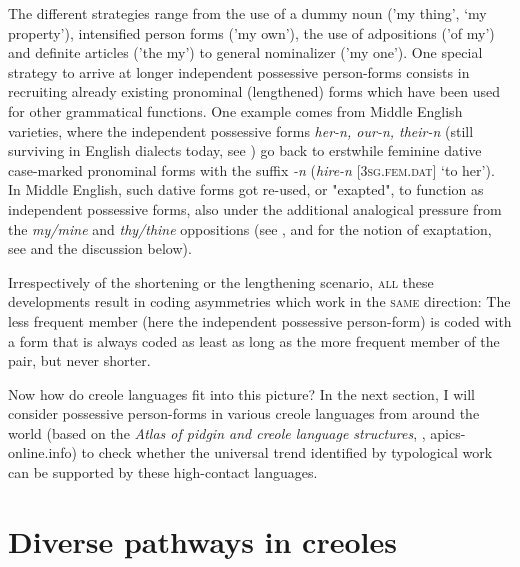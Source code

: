 \documentclass[output=paper]{langsci/langscibook}
\begin{document}
The different strategies range from the use of a dummy noun ('my thing', `my property'), intensified person forms ('my own'), the use of adpositions ('of my') and definite articles ('the my') to general nominalizer ('my one'). One special strategy to arrive at longer independent possessive person-forms consists in recruiting already existing pronominal (lengthened) forms which have been used for other grammatical functions. One example comes from Middle English varieties, where the independent possessive forms \textit{her-n, our-n, their-n} (still surviving in English dialects today, see \citealt{KortmannLunkenheimer2011}) go back to erstwhile feminine dative case-marked pronominal forms with the suffix \textit{{}-n} (\textit{hire-n} [\textsc{3sg.fem.dat}] `to her'). In Middle English, such dative forms got re-used, or "exapted", to function as independent possessive forms, also under the additional analogical pressure from the \textit{my/mine} and \textit{thy/thine} oppositions (see \citealt{Allen2002}, and for the notion of exaptation, see \citealt{Lass1990,Lass2017,NordeVandeVelde2016} and the discussion below). 

Irrespectively of the shortening or the lengthening scenario, \textsc{all} these developments result in coding asymmetries which work in the \textsc{same} direction: The less frequent member (here the independent possessive person-form) is coded with a form that is always coded as least as long as the more frequent member of the pair, but never shorter.

Now how do creole languages fit into this picture? In the next section, I will consider possessive person-forms in various creole languages from around the world (based on the \textit{Atlas of pidgin and creole language structures}, \citealt{MichaelisEtAl2013}, apics-online.info) to check whether the universal trend identified by typological work can be supported by these high-contact languages.

\section{Diverse pathways in creoles}
\end{document}
